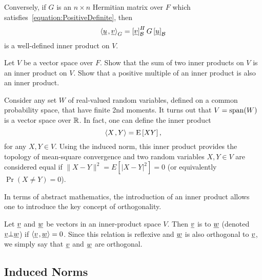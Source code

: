 Conversely, if $G$ is an $n \times n$ Hermitian matrix over $F$ which satisfies~\eqref{equation:PositiveDefinite}, then
\begin{equation*}
{\left\langle  \underline{u}  \mskip2mu ,  \underline{v}  \right\rangle}_G
= \left[ \underline{v} \right]_{\mathcal{B}}^H G \left[ \underline{u} \right]_{\mathcal{B}}
\end{equation*}
is a well-defined inner product on $V$.
\begin{problem}
Let $V$ be a vector space over $F$.
Show that the sum of two inner products on $V$ is an inner product on $V$.
Show that a positive multiple of an inner product is also an inner product.
\end{problem}

\begin{example}
Consider any set $W$ of real-valued random variables, defined on a common probability space, that have finite 2nd moments.
It turns out that $V = \mathrm{span} (W)$ is a vector space over $\mathbb{R}$.
In fact, one can define the inner product
\begin{equation*}
{\left\langle  X  \mskip2mu ,  Y  \right\rangle} = \mathrm{E} \left[ XY \right] ,
\end{equation*}
for any $X,Y \in V$.
Using the induced norm, this inner product provides the topology of mean-square convergence and two random variables $X,Y\in V$ are considered equal if $\| X-Y \|^2 = E \left[ |X-Y|^2 \right] = 0$ (or equivalently $\Pr (X \neq Y ) = 0$).
\end{example}

In terms of abstract mathematics, the introduction of an inner product allows one to introduce the key concept of orthogonality.

\begin{definition}
Let $\underline{v}$ and $\underline{w}$ be vectors in an inner-product space $V$.
Then $\underline{v}$ is  to $\underline{w}$ (denoted $\underline{v} \bot \underline{w}$) if ${\left\langle  \underline{v}  \mskip2mu ,  \underline{w}  \right\rangle} = 0$.
Since this relation is reflexive and $\underline{w}$ is also orthogonal to $\underline{v}$, we simply say that $\underline{v}$ and $\underline{w}$ are orthogonal.
\end{definition}


\subsection{Induced Norms}


